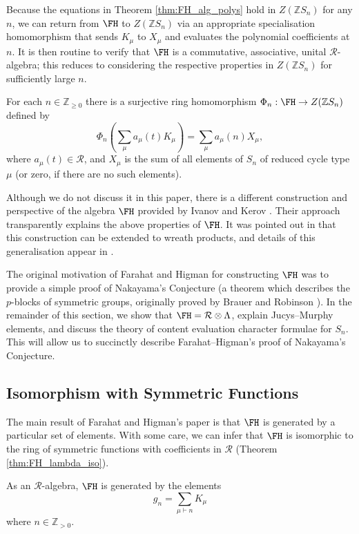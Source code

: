 Because the equations in Theorem \ref{thm:FH_alg_polys} hold in $Z(\mathbb{Z}S_n)$ for any $n$, we can return from $\FH$ to $Z(\mathbb{Z}S_n)$ via an appropriate specialisation homomorphism that sends $K_\mu$ to $X_\mu$ and evaluates the polynomial coefficients at $n$. It is then routine to verify that $\FH$ is a commutative, associative, unital $\mathcal{R}$-algebra; this reduces to considering the respective properties in $Z(\mathbb{Z}S_n)$ for sufficiently large $n$. 

\begin{theorem} \label{thm:FH_spec_hom}
For each $n \in \mathbb{Z}_{\geq 0}$ there is a surjective ring homomorphism $\Phi_n: \FH \to Z(\mathbb{Z}S_n)$ defined by
\[
\Phi_n \left( \sum_{\mu} a_\mu(t) K_\mu \right) = \sum_{\mu} a_\mu(n) X_\mu,
\]
where $a_\mu(t) \in \mathcal{R}$, and $X_\mu$ is the sum of all elements of $S_n$ of reduced cycle type $\mu$ \textup{(}or zero, if there are no such elements\textup{)}.
\end{theorem}
\begin{remark}
Although we do not discuss it in this paper, there is a different construction and perspective of the algebra $\FH$ provided by Ivanov and Kerov \cite{IvanovKerov}. Their approach transparently explains the above properties of $\FH$. It was pointed out in \cite{Wang2} that this construction can be extended to wreath products, and details of this generalisation appear in \cite{Tout}.
\end{remark}

The original motivation of Farahat and Higman for constructing $\FH$ was to provide a simple proof of Nakayama's Conjecture (a theorem which describes the $p$-blocks of symmetric groups, originally proved by Brauer and Robinson \cite{BrauerRobinson}). In the remainder of this section, we show that $\FH = \mathcal{R} \otimes \Lambda$, explain Jucys--Murphy elements, and discuss the theory of content evaluation character formulae for $S_n$. This will allow us to succinctly describe Farahat--Higman's proof of Nakayama's Conjecture.

\subsection{Isomorphism with Symmetric Functions}
The main result of Farahat and Higman's paper is that $\FH$ is generated by a particular set of elements. With some care, we can infer that $\FH$ is isomorphic to the ring of symmetric functions with coefficients in $\mathcal{R}$ (Theorem \ref{thm:FH_lambda_iso}).
\begin{theorem} \label{thm:FH_generation_thm}
As an $\mathcal{R}$-algebra, $\FH$ is generated by the elements
\[
g_n = \sum_{\mu \vdash n} K_\mu
\]
where $n \in \mathbb{Z}_{>0}$.
\end{theorem}

